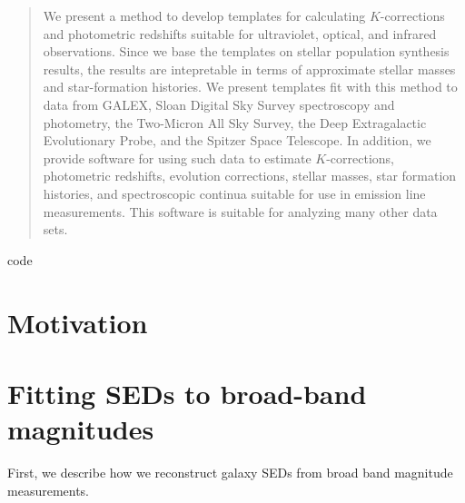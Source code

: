 \documentclass[10pt,preprint]{aastex}
\newcounter{address}
\begin{document}

\clearpage

\begin{abstract}
We present a method to develop templates for calculating
$K$-corrections and photometric redshifts suitable for ultraviolet,
optical, and infrared observations. Since we base the templates on
stellar population synthesis results, the results are intepretable in
terms of approximate stellar masses and star-formation histories. We
present templates fit with this method to data from GALEX, Sloan
Digital Sky Survey spectroscopy and photometry, the Two-Micron All Sky
Survey, the Deep Extragalactic Evolutionary Probe, and the Spitzer
Space Telescope. In addition, we provide software for using such data
to estimate $K$-corrections, photometric redshifts, evolution
corrections, stellar masses, star formation histories, and
spectroscopic continua suitable for use in emission line measurements.
This software is suitable for analyzing many other data sets.
\end{abstract}code


\section{Motivation}
\label{motivation}


\section{Fitting SEDs to broad-band magnitudes}
\label{sedfit}

First, we describe how we reconstruct galaxy SEDs from broad band
magnitude measurements. 
\end{document}
